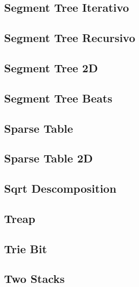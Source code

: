 \subsection{Segment Tree Iterativo}
\raggedbottom
\hrulefill
\subsection{Segment Tree Recursivo}
\raggedbottom
\hrulefill
\subsection{Segment Tree 2D}
\raggedbottom
\hrulefill
\subsection{Segment Tree Beats}
\raggedbottom
\hrulefill
\subsection{Sparse Table}
\raggedbottom
\hrulefill
\subsection{Sparse Table 2D}
\raggedbottom
\hrulefill
\subsection{Sqrt Descomposition}
\raggedbottom
\hrulefill
\subsection{Treap}
\raggedbottom
\hrulefill
\subsection{Trie Bit}
\raggedbottom
\hrulefill
\subsection{Two Stacks}
\raggedbottom
\hrulefill
